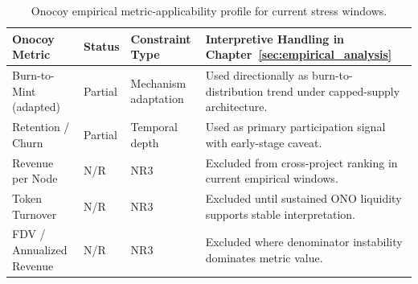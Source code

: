 \begin{table}[ht]
    \centering
    \footnotesize
    \renewcommand{\arraystretch}{1.2}
    \setlength{\tabcolsep}{4pt}
    \begin{tabularx}{\textwidth}{@{}>{\raggedright\arraybackslash}p{}>{\raggedright\arraybackslash}p{}>{\raggedright\arraybackslash}p{}X@{}}
        \toprule
        \textbf{Onocoy Metric} & \textbf{Status} & \textbf{Constraint Type} & \textbf{Interpretive Handling in Chapter~\ref{sec:empirical_analysis}} \\
        \midrule
        Burn-to-Mint (adapted) & Partial & Mechanism adaptation & Used directionally as burn-to-distribution trend under capped-supply architecture. \\
        Retention / Churn & Partial & Temporal depth & Used as primary participation signal with early-stage caveat. \\
        Revenue per Node & N/R & NR3 & Excluded from cross-project ranking in current empirical windows. \\
        Token Turnover & N/R & NR3 & Excluded until sustained ONO liquidity supports stable interpretation. \\
        FDV / Annualized Revenue & N/R & NR3 & Excluded where denominator instability dominates metric value. \\
        \bottomrule
    \end{tabularx}
    \caption{Onocoy empirical metric-applicability profile for current stress windows.}
    \label{tab:app_onocoy_metric_applicability}
\end{table}
